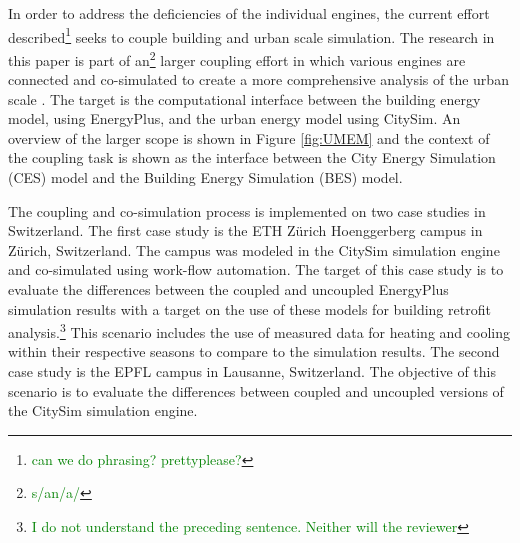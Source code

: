 \documentclass{tBPS2e}
\theoremstyle{plain}
\theoremstyle{definition}
\theoremstyle{remark}
\newcommand{\noteDT}[1]{\footnote{\textcolor{green}{#1}}}
\begin{document}
In order to address the deficiencies of the individual engines, the current effort described\noteDT{can we do phrasing? prettyplease?} seeks to couple building and urban scale simulation. The research in this paper is part of an\noteDT{s/an/a/} larger coupling effort in which various engines are connected and co-simulated to create a more comprehensive analysis of the urban scale \citep{Dorer:2013vt,Allegrini:2012kx}. The target is the computational interface between the building energy model, using EnergyPlus, and the urban energy model using CitySim. An overview of the larger scope is shown in Figure \ref{fig:UMEM} and the context of the coupling task is shown as the interface between the City Energy Simulation (CES) model and the Building Energy Simulation (BES) model.

The coupling and co-simulation process is implemented on two case studies in Switzerland. The first case study is the ETH Z\"urich Hoenggerberg campus in Z\"urich, Switzerland. The campus was modeled in the CitySim simulation engine and co-simulated using work-flow automation. The target of this case study is to evaluate the differences between the coupled and uncoupled EnergyPlus simulation results with a target on the use of these models for building retrofit analysis.\noteDT{I do not understand the preceding sentence. Neither will the reviewer} This scenario includes the use of measured data for heating and cooling within their respective seasons to compare to the simulation results. The second case study is the EPFL campus in Lausanne, Switzerland. The objective of this scenario is to evaluate the differences between coupled and uncoupled versions of the CitySim simulation engine. 
\end{document}
